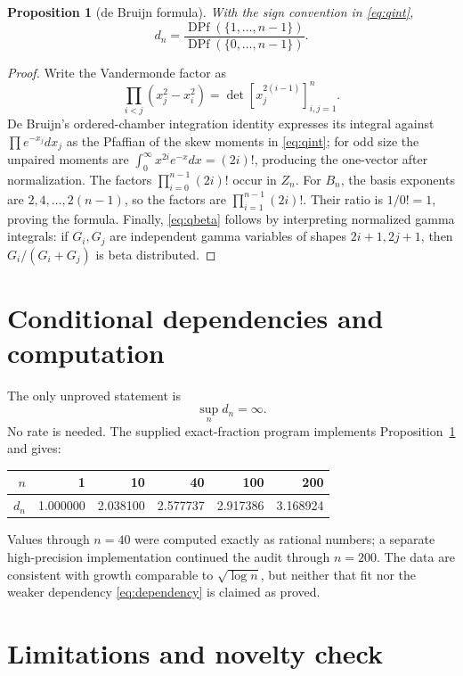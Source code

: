 \documentclass[11pt]{article}
\newtheorem{proposition}{Proposition}
\begin{document}
\begin{proposition}[de Bruijn formula]\label{prop:pf}
With the sign convention in \eqref{eq:qint},
\[
 d_n=\frac{\operatorname{DPf}(\{1,\ldots,n-1\})}
           {\operatorname{DPf}(\{0,\ldots,n-1\})}.
\]
\end{proposition}
\begin{proof}
Write the Vandermonde factor as
\[
 \prod_{i<j}(x_j^2-x_i^2)=
 \det[x_j^{2(i-1)}]_{i,j=1}^n.
\]
De Bruijn's ordered-chamber integration identity expresses its integral
against $\prod e^{-x_j}dx_j$ as the Pfaffian of the skew moments in
\eqref{eq:qint}; for odd size the unpaired moments are
$\int_0^\infty x^{2i}e^{-x}dx=(2i)!$, producing the one-vector after
normalization.  The factors $\prod_{i=0}^{n-1}(2i)!$ occur in $Z_n$.
For $B_n$, the basis exponents are $2,4,\ldots,2(n-1)$, so the factors are
$\prod_{i=1}^{n-1}(2i)!$.  Their ratio is $1/0!=1$, proving the formula.
Finally, \eqref{eq:qbeta} follows by interpreting normalized gamma integrals:
if $G_i,G_j$ are independent gamma variables of shapes $2i+1,2j+1$, then
$G_i/(G_i+G_j)$ is beta distributed.
\end{proof}

\section*{Conditional dependencies and computation}

The only unproved statement is
\begin{equation}\label{eq:dependency}
 \sup_n d_n=\infty.
\end{equation}
No rate is needed.  The supplied exact-fraction program implements
Proposition~\ref{prop:pf} and gives:
\begin{center}
\begin{tabular}{@{}rrrrrr@{}}
\toprule
$n$ & 1 & 10 & 40 & 100 & 200\\
\midrule
$d_n$ & 1.000000 & 2.038100 & 2.577737 & 2.917386 & 3.168924\\
\bottomrule
\end{tabular}
\end{center}
Values through $n=40$ were computed exactly as rational numbers; a separate
high-precision implementation continued the audit through $n=200$.  The data
are consistent with growth comparable to $\sqrt{\log n}$, but neither that fit
nor the weaker dependency \eqref{eq:dependency} is claimed as proved.

\section*{Limitations and novelty check}
\end{document}
